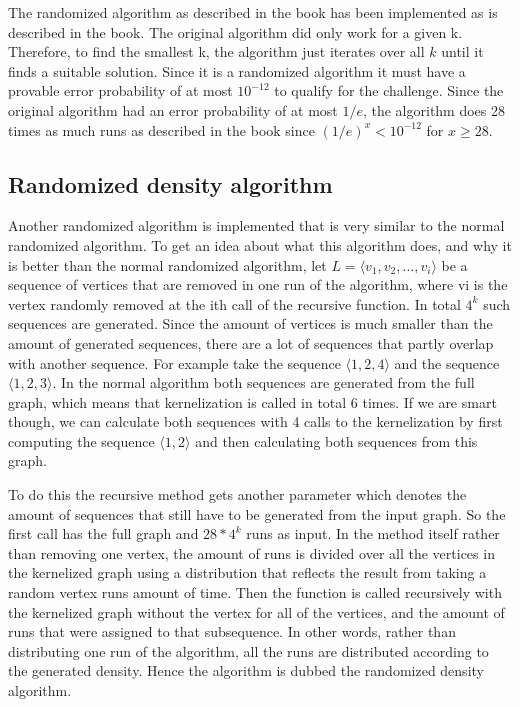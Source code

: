 The randomized algorithm as described in the book has been implemented as is described in the book. The original algorithm did only work for a given k. Therefore, to find the smallest k, the algorithm just iterates over all $k$ until it finds a suitable solution. Since it is a randomized algorithm it must have a provable error probability of at most $10^{-12}$ to qualify for the challenge. Since the original algorithm had an error probability of at most $1/e$, the algorithm does 28 times as much runs as described in the book since $(1/e)^x < 10^{-12}$ for $x \geq 28$.

\subsection{Randomized density algorithm}
Another randomized algorithm is implemented that is very similar to the normal randomized algorithm. To get an idea about what this algorithm does, and why it is better than the normal randomized algorithm, let $L = \langle v_1, v_2, ... , v_i\rangle$ be a sequence of vertices that are removed in one run of the algorithm, where vi is the vertex randomly removed at the ith call of the recursive function. In total $4^k$ such sequences are generated. Since the amount of vertices is much smaller than the amount of generated sequences, there are a lot of sequences that partly overlap with another sequence. For example take the sequence $\langle 1, 2, 4 \rangle$ and the sequence $\langle 1, 2, 3 \rangle$. In the normal algorithm both sequences are generated from the full graph, which means that kernelization is called in total 6 times. If we are smart though, we can calculate both sequences with 4 calls to the kernelization by first computing the sequence $\langle 1,2 \rangle$ and then calculating both sequences from this graph.

To do this the recursive method gets another parameter which denotes the amount of sequences that still have to be generated from the input graph. So the first call has the full graph and $28 * 4^k$ runs as input. In the method itself rather than removing one vertex, the amount of runs is divided over all the vertices in the kernelized graph using a distribution that reflects the result from taking a random vertex runs amount of time. Then the function is called recursively with the kernelized graph without the vertex for all of the vertices, and the amount of runs that were assigned to that subsequence. In other words, rather than distributing one run of the algorithm, all the runs are distributed according to the generated density. Hence the algorithm is dubbed the randomized density algorithm.

